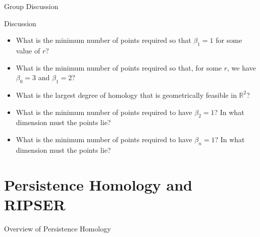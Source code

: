 \documentclass[usenames,dvipsnames,aspectratio=1610]{beamer}
\begin{document}
\begin{frame}{Group Discussion}
\begin{center}
{\Huge Discussion}
\end{center}
\begin{itemize}
\item What is the minimum number of points required so that $\beta_1 = 1$ for some value of $r$?
\item What is the minimum number of points required so that, for some $r$, we have $\beta_0 = 3$ and $\beta_1 = 2$?
\item What is the largest degree of homology that is geometrically feasible in $\mathbb{R}^2$?
\item What is the minimum number of points required to have $\beta_2 = 1$? In what dimension must the points lie?
\item What is the minimum number of points required to have $\beta_n = 1$?  In what dimension must the points lie?
\end{itemize}
\end{frame}

\section{Persistence Homology and RIPSER}

\begin{frame}{Overview of Persistence Homology}
\centering
{}
\end{frame}

\end{document}
